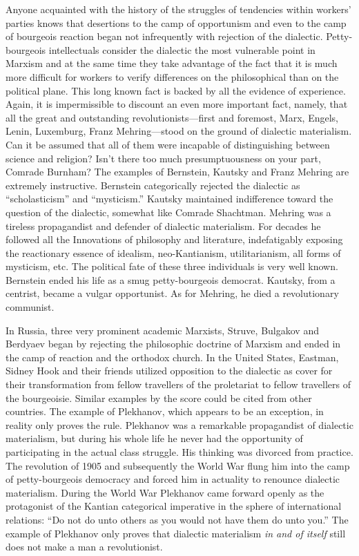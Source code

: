 Anyone acquainted with the history of the struggles of tendencies within workers’ parties knows that desertions to the camp of opportunism and even to the camp of bourgeois reaction began not infrequently with rejection of the dialectic. Petty-bourgeois intellectuals consider the dialectic the most vulnerable point in Marxism and at the same time they take advantage of the fact that it is much more difficult for workers to verify differences on the philosophical than on the political plane. This long known fact is backed by all the evidence of experience. Again, it is impermissible to discount an even more important fact, namely, that all the great and outstanding revolutionists---first and foremost, Marx, Engels, Lenin, Luxemburg, Franz Mehring---stood on the ground of dialectic materialism. Can it be assumed that all of them were incapable of distinguishing between science and religion? Isn’t there too much presumptuousness on your part, Comrade Burnham? The examples of Bernstein, Kautsky and Franz Mehring are extremely instructive. Bernstein categorically rejected the dialectic as “scholasticism” and “mysticism.” Kautsky maintained indifference toward the question of the dialectic, somewhat like Comrade Shachtman. Mehring was a tireless propagandist and defender of dialectic materialism. For decades he followed all the Innovations of philosophy and literature, indefatigably exposing the reactionary essence of idealism, neo-Kantianism, utilitarianism, all forms of mysticism, etc. The political fate of these three individuals is very well known. Bernstein ended his life as a smug petty-bourgeois democrat. Kautsky, from a centrist, became a vulgar opportunist. As for Mehring, he died a revolutionary communist.

In Russia, three very prominent academic Marxists, Struve, Bulgakov and Berdyaev began by rejecting the philosophic doctrine of Marxism and ended in the camp of reaction and the orthodox church. In the United States, Eastman, Sidney Hook and their friends utilized opposition to the dialectic as cover for their transformation from fellow travellers of the proletariat to fellow travellers of the bourgeoisie. Similar examples by the score could be cited from other countries. The example of Plekhanov, which appears to be an exception, in reality only proves the rule. Plekhanov was a remarkable propagandist of dialectic materialism, but during his whole life he never had the opportunity of participating in the actual class struggle. His thinking was divorced from practice. The revolution of 1905 and subsequently the World War flung him into the camp of petty-bourgeois democracy and forced him in actuality to renounce dialectic materialism. During the World War Plekhanov came forward openly as the protagonist of the Kantian categorical imperative in the sphere of international relations: “Do not do unto others as you would not have them do unto you.” The example of Plekhanov only proves that dialectic materialism \emph{in and of itself} still does not make a man a revolutionist.

